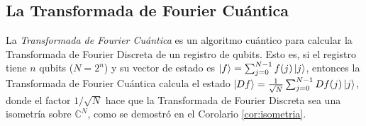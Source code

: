 \documentclass{article}
\begin{document}

\subsection{La Transformada de Fourier Cuántica} \label{sec:quantum:qft}

La \emph{Transformada de Fourier Cuántica} es un algoritmo cuántico para calcular la Transformada de Fourier Discreta de un registro de qubits. Esto es, si el registro tiene $n$ qubits ($N = 2^n$) y su vector de estado es $\ket{f} = \sum_{j = 0}^{N-1} f(j) \ket{j}$, entonces la Transformada de Fourier Cuántica calcula el estado $\ket{Df} = \frac{1}{\sqrt{N}}\sum_{j = 0}^{N-1} Df(j) \ket{j}$, donde el factor $1/\sqrt{N}$ hace que la Transformada de Fourier Discreta sea una isometría sobre $\mathbb{C}^N$, como se demostró en el Corolario \ref{cor:isometria}.
\end{document}
